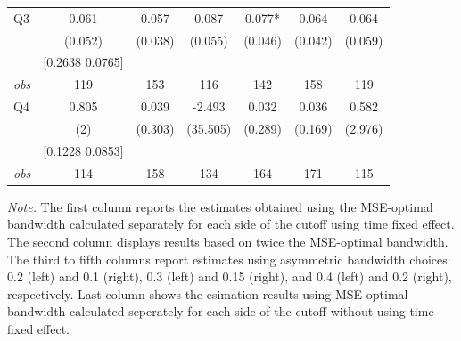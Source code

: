 \begin{table}[]
{\begin{tabular}{lcccccc}
Q3 & 0.061 & 0.057 & 0.087 & 0.077* & 0.064 & 0.064 \\ 
&(0.052)&(0.038) & (0.055)&(0.046)&(0.042)&(0.059)\\ 
& [0.2638 0.0765] & & & & & \\ 
\textit{obs} & 119 & 153 & 116 & 142 & 158 & 119 \\ 
Q4 & 0.805 & 0.039 & -2.493 & 0.032 & 0.036 & 0.582 \\ 
&(2)&(0.303) & (35.505)&(0.289)&(0.169)&(2.976)\\ 
& [0.1228 0.0853] & & & & & \\ 
\textit{obs} & 114 & 158 & 134 & 164 & 171 & 115 \\ 
\hline 
 \end{tabular}}{\textit{Note.} The first column reports the estimates obtained using the MSE-optimal bandwidth calculated separately for each side of the cutoff using time fixed effect. The second column displays results based on twice the MSE-optimal bandwidth. The third to fifth columns report estimates using asymmetric bandwidth choices: 0.2 (left) and 0.1 (right), 0.3 (left) and 0.15 (right), and 0.4 (left) and 0.2 (right), respectively. Last column shows the esimation results using MSE-optimal bandwidth calculated seperately for each side of the cutoff without using time fixed effect.}
\end{table}
